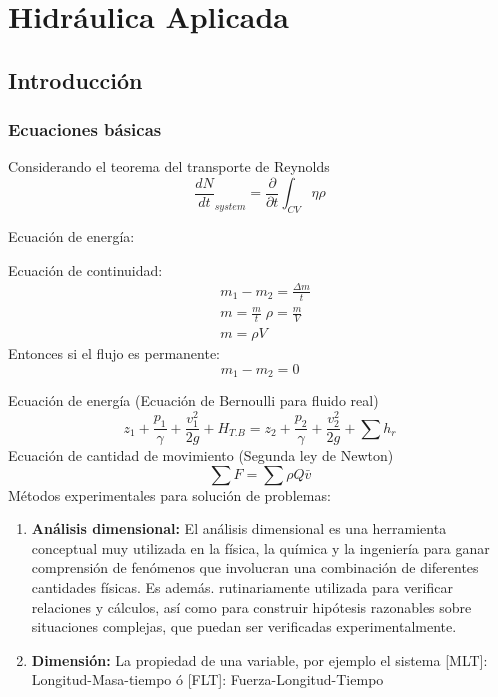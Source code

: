 \chapter{Hidráulica Aplicada}
\section{Introducción}
\subsection{Ecuaciones básicas}
Considerando el teorema del transporte de Reynolds
\begin{equation}
    \frac{dN}{dt}_{system} = \frac{\partial}{\partial t} \int_{CV} \eta \rho 
\end{equation}


Ecuación de energía:

Ecuación de continuidad:
\begin{align*}
    &m_1 - m_2 =\frac{\Delta m}{t}\\
    &m = \frac{m}{t}\; \rho = \frac{m}{V}\\
    &m =\rho V
\end{align*}
Entonces si el flujo es permanente:
\begin{equation}
    m_1 - m_2 = 0
\end{equation}

Ecuación de energía (Ecuación de Bernoulli para fluido real)
\begin{equation}
    z_1 + \frac{p_1}{\gamma} +\frac{v_1^2}{2g} + H_{T.B} = z_2 + \frac{p_2}{\gamma} +\frac{v_2^2}{2g} +\sum h_r
\end{equation}
Ecuación de cantidad de movimiento (Segunda ley de Newton)
\begin{equation}
    \sum F =\sum \rho Q \bar{v}
\end{equation}
Métodos experimentales para solución de problemas:

\begin{enumerate}
    \item \textbf{Análisis dimensional:} El análisis dimensional es una herramienta conceptual muy utilizada en la física, la química y la ingeniería para ganar comprensión de fenómenos que involucran una combinación de diferentes cantidades físicas. Es además. rutinariamente utilizada para verificar relaciones y cálculos, así como para construir hipótesis razonables sobre situaciones complejas, que puedan ser verificadas experimentalmente.
    \item \textbf{Dimensión:} La propiedad de una variable, por ejemplo el sistema [MLT]: Longitud-Masa-tiempo ó [FLT]: Fuerza-Longitud-Tiempo 
\end{enumerate}

